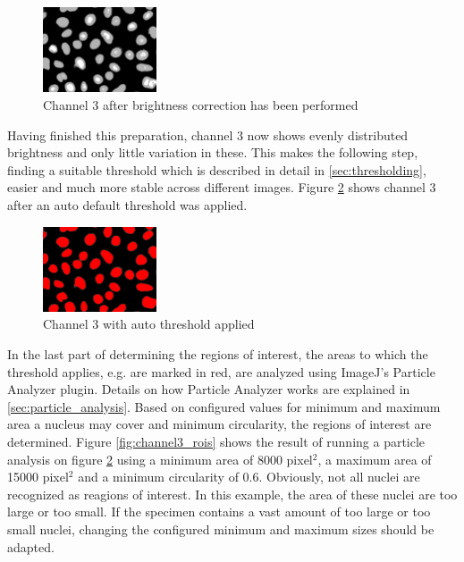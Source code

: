 \documentclass[a4paper, 12pt]{article}
\begin{document}
\begin{figure}
\vspace{-14pt}
\includegraphics[width=0.3\textwidth]{images/example_Kanal3_multiply178_gaussian2}
\caption{Channel 3 after brightness correction has been performed}
\label{fig:example_channel3_prepared}
\end{figure}

Having finished this preparation, channel 3 now shows evenly distributed
brightness and only little variation in these. This makes the following step,
finding a suitable threshold which is described in detail in
\ref{sec:thresholding}, easier and much more stable across different images.
Figure \ref{fig:channel3_threshold} shows channel 3 after an auto
default threshold was applied.

\begin{figure}
\vspace{-14pt}
\includegraphics[width=0.3\textwidth]{images/example_Kanal3_corrected_threshold}
\caption{Channel 3 with auto threshold applied}
\label{fig:channel3_threshold}
\end{figure}

In the last part of determining the regions of interest, the areas to which the
threshold applies, e.g. are marked in red, are analyzed using ImageJ's
Particle Analyzer plugin. Details on how Particle Analyzer works are explained
in \ref{sec:particle_analysis}. Based on configured values for minimum and
maximum area a nucleus may cover and minimum circularity, the regions of
interest are determined. Figure \ref{fig:channel3_rois} shows the result of
running a particle analysis on figure \ref{fig:channel3_threshold} using a
minimum area of 8000 pixel$^2$, a maximum area of 15000 pixel$^2$ and a minimum
circularity of 0.6. Obviously, not all nuclei are recognized as reagions of
interest. In this example, the area of these nuclei are too large or too small.
If the specimen contains a vast amount of too large or too small nuclei,
changing the configured minimum and maximum sizes should be adapted. 
\end{document}

